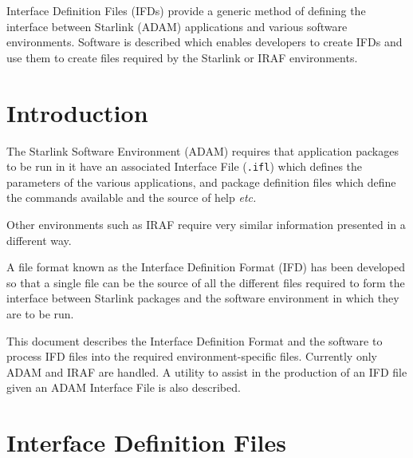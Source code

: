 \documentclass[twoside,11pt]{article}
\newcommand{\stardocinitials}  {SSN}
\newcommand{\stardocnumber}    {68.3}
\newcommand{\stardocabstract}  {Interface Definition Files (IFDs) provide a 
generic method of defining the interface between Starlink 
(\xref{ADAM}{sg4}{}) applications 
and various software environments.  Software is described which enables 
developers to create IFDs and use them to create files required by the
Starlink or 
\htmladdnormallink{IRAF}{\IRAFURL} environments.}
\newcommand{\stardocname}{\stardocinitials /\stardocnumber}
\newcommand{\htmladdnormallink}[2]{#1}
\newenvironment{latexonly}{}{}
\newcommand{\xref}[3]{#1}
\newcommand{\xlabel}[1]{}
\newcommand{\latexonlytoc}[0]{\tableofcontents}
\newcommand{\IRAFURL}{http://star-www.rl.ac.uk/iraf/web/iraf-homepage.html}
\renewcommand{\thepage}{\roman{page}}
\begin{document}
\stardocabstract
  \newpage
  \begin{latexonly}
    \setlength{\parskip}{0mm}
    \latexonlytoc
    \setlength{\parskip}{\medskipamount}
    \markboth{\stardocname}{\stardocname}
  \end{latexonly}
\cleardoublepage
\renewcommand{\thepage}{\arabic{page}}
\setcounter{page}{1}


\section{\xlabel{introduction}Introduction}
The 
\xref{Starlink Software Environment (ADAM)}{sg4}{}
requires that application packages
to be run in it have an associated Interface File (\texttt{.ifl}) which defines 
the parameters of the various applications, and package definition files 
which define the commands available and the source of help \textit{etc.}

Other environments such as 
\htmladdnormallink{IRAF}{\IRAFURL} require very similar information presented
in a different way.

A file format known as the Interface Definition Format (IFD) has been developed
so that a single file can be the source of all the different files required
to form the interface between Starlink packages and the software environment
in which they are to be run.

This document describes the Interface Definition Format and the software to 
process IFD files into the required environment-specific files. Currently
only ADAM and IRAF are handled.  A utility to assist in the production of an
IFD file given an ADAM Interface File is also described.

\section{\xlabel{interface_definition_files}Interface Definition Files}
\end{document}
